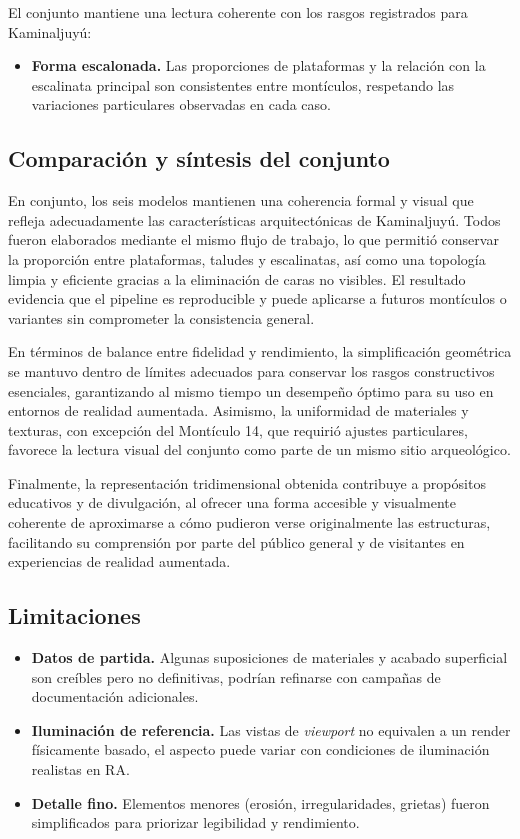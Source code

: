 El conjunto mantiene una lectura coherente con los rasgos registrados para Kaminaljuyú:
\begin{itemize}
    \item \textbf{Forma escalonada.} Las proporciones de plataformas y la relación con la escalinata principal son consistentes entre montículos, respetando las variaciones particulares observadas en cada caso.
\end{itemize}

\subsection{Comparación y síntesis del conjunto}

En conjunto, los seis modelos mantienen una coherencia formal y visual que refleja adecuadamente las características arquitectónicas de Kaminaljuyú. Todos fueron elaborados mediante el mismo flujo de trabajo, lo que permitió conservar la proporción entre plataformas, taludes y escalinatas, así como una topología limpia y eficiente gracias a la eliminación de caras no visibles. El resultado evidencia que el \gls{pipeline} es reproducible y puede aplicarse a futuros montículos o variantes sin comprometer la consistencia general.

En términos de balance entre fidelidad y rendimiento, la simplificación geométrica se mantuvo dentro de límites adecuados para conservar los rasgos constructivos esenciales, garantizando al mismo tiempo un desempeño óptimo para su uso en entornos de realidad aumentada. Asimismo, la uniformidad de materiales y texturas, con excepción del Montículo 14, que requirió ajustes particulares, favorece la lectura visual del conjunto como parte de un mismo sitio arqueológico.

Finalmente, la representación tridimensional obtenida contribuye a propósitos educativos y de divulgación, al ofrecer una forma accesible y visualmente coherente de aproximarse a cómo pudieron verse originalmente las estructuras, facilitando su comprensión por parte del público general y de visitantes en experiencias de realidad aumentada.

\subsection{Limitaciones}

\begin{itemize}
    \item \textbf{Datos de partida.} Algunas suposiciones de materiales y acabado superficial son creíbles pero no definitivas, podrían refinarse con campañas de documentación adicionales.
    \item \textbf{Iluminación de referencia.} Las vistas de \emph{viewport} no equivalen a un render físicamente basado, el aspecto puede variar con condiciones de iluminación realistas en RA.
    \item \textbf{Detalle fino.} Elementos menores (erosión, irregularidades, grietas) fueron simplificados para priorizar legibilidad y rendimiento.
\end{itemize}

